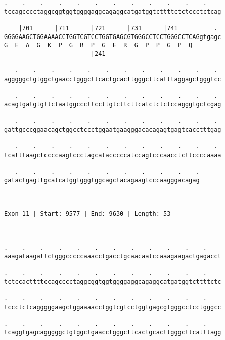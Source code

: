 \documentclass{article}
\begin{document}
\begin{Verbatim}
.    .    .    .    .    .    .    .    .    .    .    .    
tccagcccctaggcggtggtggggaggcagaggcatgatggtcttttctctccctctcag
                                                            
    |701      |711      |721      |731      |741          . 
GGGGAAGCTGGAAAACCTGGTCGTCCTGGTGAGCGTGGGCCTCCTGGGCCTCAGgtgagc
G  E  A  G  K  P  G  R  P  G  E  R  G  P  P  G  P  Q        
                        |241                                
  
   .    .    .    .    .    .    .    .    .    .    .    . 
agggggctgtggctgaacctgggcttcactgcacttgggcttcatttaggagctgggtcc
                                                            
   .    .    .    .    .    .    .    .    .    .    .    . 
acagtgatgtgttctaatggcccttccttgtcttcttcatctctctccagggtgctcgag
                                                            
   .    .    .    .    .    .    .    .    .    .    .    . 
gattgcccggaacagctggcctccctggaatgaagggacacagagtgagtcacctttgag
                                                            
   .    .    .    .    .    .    .    .    .    .    .    . 
tcatttaagctccccaagtccctagcatacccccatccagtcccaacctcttccccaaaa
                                                            
   .    .    .    .    .    .    .    .    .    .    .
gatactgagttgcatcatggtgggtggcagctacagaagtcccaagggacagag
                                                      
                                                      
 
Exon 11 | Start: 9577 | End: 9630 | Length: 53



.    .    .    .    .    .    .    .    .    .    .    .    
aaagataagattctgggcccccaaacctgacctgcaacaatccaaagaagactgagacct
                                                            
.    .    .    .    .    .    .    .    .    .    .    .    
tctccacttttccagcccctaggcggtggtggggaggcagaggcatgatggtcttttctc
                                                            
.    .    .    .    .    .    .    .    .    .    .    .    
tccctctcagggggaagctggaaaacctggtcgtcctggtgagcgtgggcctcctgggcc
                                                            
.    .    .    .    .    .    .    .    .    .    .    .    
tcaggtgagcagggggctgtggctgaacctgggcttcactgcacttgggcttcatttagg
                                                            

\end{Verbatim}
\end{document}
